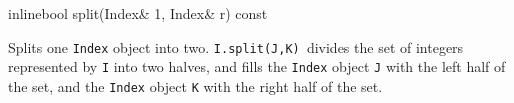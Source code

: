 \begin{smallcode}
inlinebool split(Index& 1, Index& r) const 
\end{smallcode}
Splits one \texttt{Index} object into two. \texttt{I.split(J,K) }divides the set of integers represented by \texttt{I} into two halves, and fills the \texttt{Index} object \texttt{J} with the left half of the set, and the \texttt{Index} object \texttt{K} 
with the right half of the set. 












